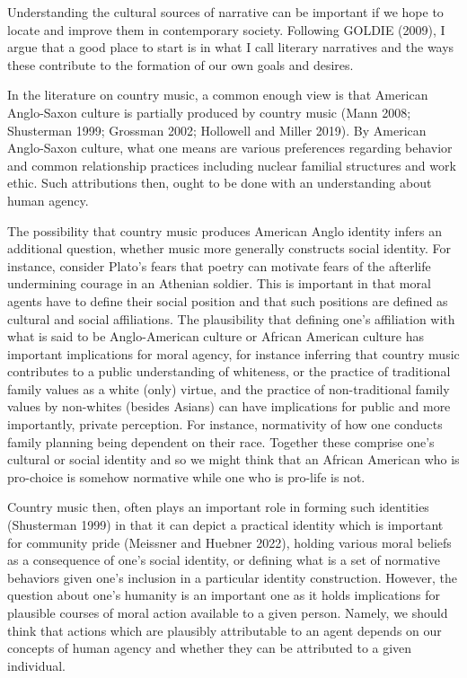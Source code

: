 \documentclass[12pt]{book}
\theoremstyle{definition}
\theoremstyle{remark}
\begin{document}
Understanding the cultural sources of narrative can be important if we hope to locate and improve them in contemporary society. Following GOLDIE (2009), I argue that a good place to start is in what I call literary narratives and the ways these contribute to the formation of our own goals and desires.

In the literature on country music, a common enough view is that American Anglo-Saxon culture is partially produced by country music (Mann 2008; Shusterman 1999; Grossman 2002; Hollowell and Miller 2019). By American Anglo-Saxon culture, what one means are various preferences regarding behavior and common relationship practices including nuclear familial structures and work ethic. Such attributions then, ought to be done with an understanding about human agency.

The possibility that country music produces American Anglo identity infers an additional question, whether music more generally constructs social identity. For instance, consider Plato's fears that poetry can motivate fears of the afterlife undermining courage in an Athenian soldier. This is important in that moral agents have to define their social position and that such positions are defined as cultural and social affiliations. The plausibility that defining one's affiliation with what is said to be Anglo-American culture or African American culture has important implications for moral agency, for instance inferring that country music contributes to a public understanding of whiteness, or the practice of traditional family values as a white (only) virtue, and the practice of non-traditional family values by non-whites (besides Asians) can have implications for public and more importantly, private perception. For instance, normativity of how one conducts family planning being dependent on their race. Together these comprise one's cultural or social identity and so we might think that an African American who is pro-choice is somehow normative while one who is pro-life is not.

Country music then, often plays an important role in forming such identities (Shusterman 1999) in that it can depict a practical identity which is important for community pride (Meissner and Huebner 2022), holding various moral beliefs as a consequence of one's social identity, or defining what is a set of normative behaviors given one's inclusion in a particular identity construction. However, the question about one's humanity is an important one as it holds implications for plausible courses of moral action available to a given person. Namely, we should think that actions which are plausibly attributable to an agent depends on our concepts of human agency and whether they can be attributed to a given individual.
\end{document}
